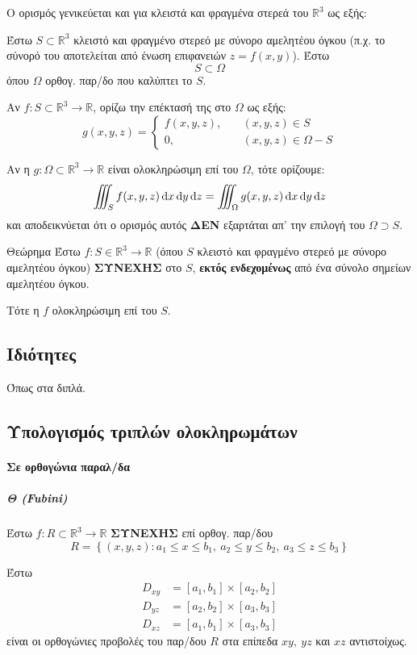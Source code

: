 \documentclass[11pt,a4paper,titlepage,draft]{article}
\newcommand{\textlatin}[1]{#1}
\begin{document}
Ο ορισμός γενικεύεται και για κλειστά και φραγμένα στερεά του \( \mathbb R ^3\) ως εξής:

Έστω \(S \subset  \mathbb R ^3 \) κλειστό και φραγμένο στερεό με σύνορο αμελητέου όγκου (π.χ. το σύνορό του αποτελείται από ένωση επιφανειών \(z=f(x,y)\)). Έστω
\[
S \subset \Omega
\]
όπου \(\Omega\) ορθογ. παρ/δο που καλύπτει το \(S\).

Αν $f:S \subset \mathbb R^3 \to  \mathbb R $, ορίζω την επέκτασή της στο \(\Omega\) ως εξής:
\[
g(x,y,z) = \begin{cases}
f(x,y,z),\quad&(x,y,z)\in S\\
0,\quad&(x,y,z)\in \Omega-S
\end{cases}
\]

Αν η \(g:\Omega \subset  \mathbb R ^3\to \mathbb R \) είναι ολοκληρώσιμη επί του \(\Omega\), τότε ορίζουμε:
\[
\iiint_S f(x,y,z)\dif x\dif y\dif z=
\iiint_\Omega g(x,y,z)\dif x\dif y \dif z
\]
και αποδεικνύεται ότι ο ορισμός αυτός \textbf{ΔΕΝ} εξαρτάται απ' την επιλογή του \(\Omega \supset S\).

\begin{attnbox}{Θεώρημα}
Έστω \(f:S\in  \mathbb R ^3\to  \mathbb R \) (όπου $S$ κλειστό και φραγμένο στερεό με σύνορο αμελητέου όγκου) \textbf{ΣΥΝΕΧΗΣ} στο \(S\), \textbf{εκτός ενδεχομένως} από ένα σύνολο σημείων αμελητέου όγκου.

Τότε η \(f\) ολοκληρώσιμη επί του \(S\).
\end{attnbox}

\subsection{Ιδιότητες}
Όπως στα διπλά.

\subsection{Υπολογισμός τριπλών ολοκληρωμάτων}
\paragraph{ Σε ορθογώνια παραλ/δα}
\subparagraph{Θ (\textlatin{Fubini})} Έστω \(f:R \subset  \mathbb R ^3\to  \mathbb R \) \textbf{ΣΥΝΕΧΗΣ} επί ορθογ. παρ/δου
\[
R =  \left\lbrace (x,y,z): a_1\leq x\leq b_1,\ a_2\leq y\leq b_2,\ a_3\leq z\leq b_3  \right\rbrace
\]

Έστω \begin{align*}
D_{xy} &= [a_1,b_1]\times[a_2,b_2]\\
D_{yz} &= [a_2,b_2]\times[a_3,b_3]\\
D_{xz} &= [a_1,b_1]\times[a_3,b_3]
\end{align*}
είναι οι ορθογώνιες προβολές του παρ/δου \(R\) στα επίπεδα \(xy,\ yz\) και \(xz\) αντιστοίχως.
\end{document}
